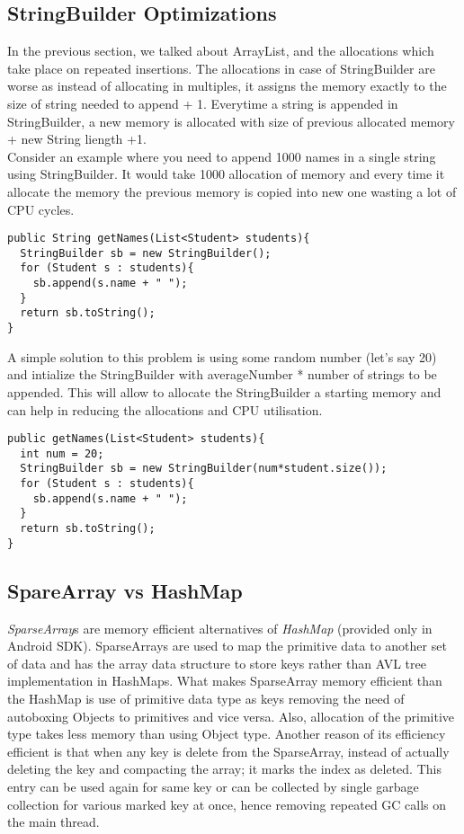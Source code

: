 \documentclass[journal]{IEEEtran}
\begin{document}
\newpage

\subsection{StringBuilder Optimizations}
In the previous section, we talked about ArrayList, and the allocations which take place on repeated insertions. The allocations in case of StringBuilder are worse as instead of allocating in multiples, it assigns the memory exactly to the size of string needed to append + 1. Everytime a string is appended in StringBuilder, a new memory is allocated with size of previous allocated memory + new String liength +1.\\
Consider an example where you need to append 1000 names in a single string using StringBuilder. It would take 1000 allocation of memory and every time it allocate the memory the previous memory is copied into new one wasting a lot of CPU cycles.
\begin{verbatim}
public String getNames(List<Student> students){
  StringBuilder sb = new StringBuilder();
  for (Student s : students){
    sb.append(s.name + " ");
  }
  return sb.toString();
}
\end{verbatim}
A simple solution to this problem is using some random number (let's say 20) and intialize the StringBuilder with averageNumber * number of strings to be appended. This will allow to allocate the StringBuilder a starting memory and can help in reducing the allocations and CPU utilisation.
\begin{verbatim}
public getNames(List<Student> students){
  int num = 20;
  StringBuilder sb = new StringBuilder(num*student.size());
  for (Student s : students){
    sb.append(s.name + " ");
  }
  return sb.toString();
}
\end{verbatim}

\subsection{SpareArray vs HashMap}
\emph{SparseArray}s are memory efficient alternatives of \emph{HashMap} (provided only in Android SDK). SparseArrays are used to map the primitive data to another set of data and has the array data structure to store keys rather than AVL tree implementation in HashMaps. What makes SparseArray memory efficient than the HashMap is use of primitive data type as keys removing the need of autoboxing Objects to primitives and vice versa. Also, allocation of the primitive type takes less memory than using Object type. Another reason of its efficiency efficient is that when any key is delete from the SparseArray, instead of actually deleting the key and compacting the array; it marks the index as deleted. This entry can be used again for same key or can be collected by single garbage collection for various marked key at once, hence removing repeated GC calls on the main thread.
\end{document}
